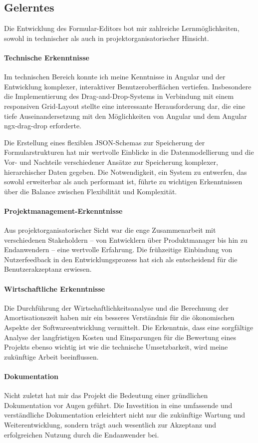 \documentclass[a4paper,11pt]{article}
\begin{document}
\subsection{Gelerntes}
Die Entwicklung des Formular-Editors bot mir zahlreiche Lernmöglichkeiten, sowohl in technischer als auch in projektorganisatorischer Hinsicht.

\paragraph{Technische Erkenntnisse}
Im technischen Bereich konnte ich meine Kenntnisse in Angular und der Entwicklung komplexer, interaktiver Benutzeroberflächen vertiefen. Insbesondere die Implementierung des Drag-and-Drop-Systems in Verbindung mit einem responsiven Grid-Layout stellte eine interessante Herausforderung dar, die eine tiefe Auseinandersetzung mit den Möglichkeiten von Angular und dem Angular ngx-drag-drop erforderte.

\noindent Die Erstellung eines flexiblen JSON-Schemas zur Speicherung der Formularstrukturen hat mir wertvolle Einblicke in die Datenmodellierung und die Vor- und Nachteile verschiedener Ansätze zur Speicherung komplexer, hierarchischer Daten gegeben. Die Notwendigkeit, ein System zu entwerfen, das sowohl erweiterbar als auch performant ist, führte zu wichtigen Erkenntnissen über die Balance zwischen Flexibilität und Komplexität.

\paragraph{Projektmanagement-Erkenntnisse}
Aus projektorganisatorischer Sicht war die enge Zusammenarbeit mit verschiedenen Stakeholdern – von Entwicklern über Produktmanager bis hin zu Endanwendern – eine wertvolle Erfahrung. Die frühzeitige Einbindung von Nutzerfeedback in den Entwicklungsprozess hat sich als entscheidend für die Benutzerakzeptanz erwiesen.

\paragraph{Wirtschaftliche Erkenntnisse}
Die Durchführung der Wirtschaftlichkeitsanalyse und die Berechnung der Amortisationszeit haben mir ein besseres Verständnis für die ökonomischen Aspekte der Softwareentwicklung vermittelt. Die Erkenntnis, dass eine sorgfältige Analyse der langfristigen Kosten und Einsparungen für die Bewertung eines Projekts ebenso wichtig ist wie die technische Umsetzbarkeit, wird meine zukünftige Arbeit beeinflussen.

\paragraph{Dokumentation}
Nicht zuletzt hat mir das Projekt die Bedeutung einer gründlichen Dokumentation vor Augen geführt. Die Investition in eine umfassende und verständliche Dokumentation erleichtert nicht nur die zukünftige Wartung und Weiterentwicklung, sondern trägt auch wesentlich zur Akzeptanz und erfolgreichen Nutzung durch die Endanwender bei.
\end{document}
